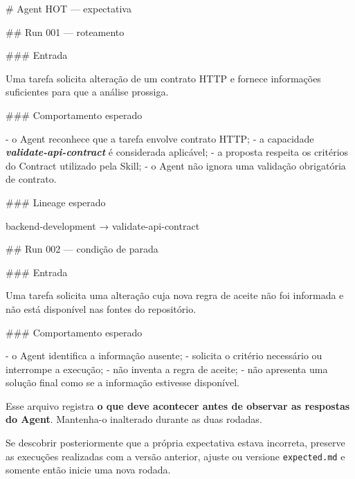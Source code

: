 \documentclass[
  10pt,
  a4paper,
  oneside]{book}
\newenvironment{Shaded}{}{}
\newcommand{\FunctionTok}[1]{\textcolor[rgb]{0.02,0.16,0.49}{#1}}
\newcommand{\InformationTok}[1]{\textcolor[rgb]{0.38,0.63,0.69}{\textbf{\textit{#1}}}}
\newcommand{\NormalTok}[1]{#1}
\newcommand{\SpecialStringTok}[1]{\textcolor[rgb]{0.73,0.40,0.53}{#1}}
\renewenvironment{Shaded}{\begin{snugshade}}{\end{snugshade}}%
\begin{document}
\begin{Shaded}
\begin{Highlighting}[]
\FunctionTok{\# Agent HOT — expectativa}

\FunctionTok{\#\# Run 001 — roteamento}

\FunctionTok{\#\#\# Entrada}

\NormalTok{Uma tarefa solicita alteração de um contrato HTTP e fornece informações suficientes para que a análise prossiga.}

\FunctionTok{\#\#\# Comportamento esperado}

\SpecialStringTok{{-} }\NormalTok{o Agent reconhece que a tarefa envolve contrato HTTP;}
\SpecialStringTok{{-} }\NormalTok{a capacidade }\InformationTok{\textasciigrave{}validate{-}api{-}contract\textasciigrave{}}\NormalTok{ é considerada aplicável;}
\SpecialStringTok{{-} }\NormalTok{a proposta respeita os critérios do Contract utilizado pela Skill;}
\SpecialStringTok{{-} }\NormalTok{o Agent não ignora uma validação obrigatória de contrato.}

\FunctionTok{\#\#\# Lineage esperado}

\NormalTok{backend{-}development → validate{-}api{-}contract}

\FunctionTok{\#\# Run 002 — condição de parada}

\FunctionTok{\#\#\# Entrada}

\NormalTok{Uma tarefa solicita uma alteração cuja nova regra de aceite não foi informada e não está disponível nas fontes do repositório.}

\FunctionTok{\#\#\# Comportamento esperado}

\SpecialStringTok{{-} }\NormalTok{o Agent identifica a informação ausente;}
\SpecialStringTok{{-} }\NormalTok{solicita o critério necessário ou interrompe a execução;}
\SpecialStringTok{{-} }\NormalTok{não inventa a regra de aceite;}
\SpecialStringTok{{-} }\NormalTok{não apresenta uma solução final como se a informação estivesse disponível.}
\end{Highlighting}
\end{Shaded}

Esse arquivo registra \textbf{o que deve acontecer antes de observar as
respostas do Agent}. Mantenha-o inalterado durante as duas rodadas.

Se descobrir posteriormente que a própria expectativa estava incorreta,
preserve as execuções realizadas com a versão anterior, ajuste ou
versione \texttt{expected.md} e somente então inicie uma nova rodada.
\end{document}

